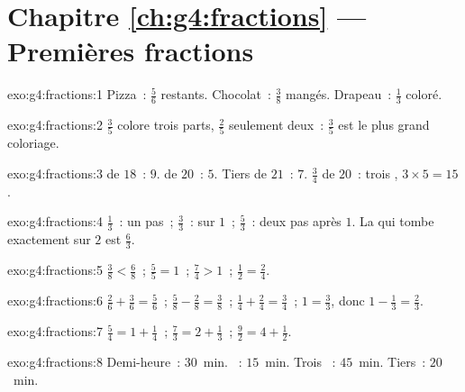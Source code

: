 \section*{Chapitre \ref{ch:g4:fractions} --- Premières fractions}

\begin{solution}{exo:g4:fractions:1}
Pizza~: $\frac56$ restants. Chocolat~: $\frac38$ mangés. Drapeau~:
$\frac13$ coloré.
\end{solution}

\begin{solution}{exo:g4:fractions:2}
$\frac35$ colore trois parts, $\frac25$ seulement deux~:
$\frac35$ est le plus grand coloriage.
\end{solution}

\begin{solution}{exo:g4:fractions:3}
 de $18$~: $9$.  de $20$~: $5$. Tiers de $21$~: $7$.
$\frac34$ de $20$~: trois , $3 \times 5 = 15$.
\end{solution}

\begin{solution}{exo:g4:fractions:4}
$\frac13$~: un pas~; $\frac33$~: sur $1$~; $\frac53$~: deux pas
après $1$. La  qui tombe exactement sur $2$ est
$\frac63$.
\end{solution}

\begin{solution}{exo:g4:fractions:5}
$\frac38 < \frac68$~; \quad $\frac55 = 1$~; \quad $\frac74 > 1$~;
\quad $\frac12 = \frac24$.
\end{solution}

\begin{solution}{exo:g4:fractions:6}
$\frac26 + \frac36 = \frac56$~; \quad
$\frac58 - \frac28 = \frac38$~; \quad
$\frac14 + \frac24 = \frac34$~; \quad
$1 = \frac33$, donc $1 - \frac13 = \frac23$.
\end{solution}

\begin{solution}{exo:g4:fractions:7}
$\frac54 = 1 + \frac14$~; \quad
$\frac73 = 2 + \frac13$~; \quad
$\frac92 = 4 + \frac12$.
\end{solution}

\begin{solution}{exo:g4:fractions:8}
Demi-heure~: $30$~min. ~: $15$~min. Trois ~: $45$~min.
Tiers~: $20$~min.
\end{solution}

